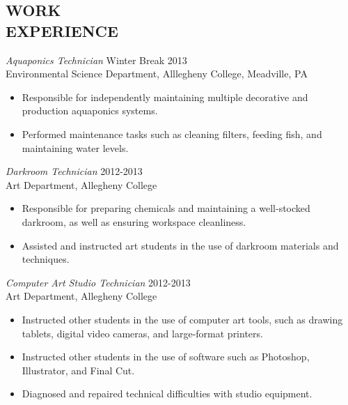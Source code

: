 \documentclass[line,margin]{res}
\begin{document}
\begin{resume}
\section{WORK \\ EXPERIENCE} 
                {\sl Aquaponics Technician} \hfill Winter Break 2013 \\
                Environmental Science Department, Alllegheny College, Meadville, PA
                 \begin{itemize}  \itemsep -2pt %
                    \item Responsible for independently maintaining multiple decorative and production aquaponics systems.
                    \item Performed maintenance tasks such as cleaning filters, feeding fish, and maintaining water levels.
                \end{itemize}
 
                {\sl Darkroom Technician} \hfill            2012-2013 \\
                Art Department, Allegheny College
                 \begin{itemize}  \itemsep -2pt %
                    \item Responsible for preparing chemicals and maintaining a well-stocked darkroom, as well as ensuring workspace cleanliness.
                    \item Assisted and instructed art students in the use of darkroom materials and techniques.
                 \end{itemize} 

                {\sl Computer Art Studio Technician} \hfill        2012-2013 \\
                Art Department, Allegheny College
                  \begin{itemize} \itemsep -2pt %
                   \item Instructed other students in the use of computer art tools, such as drawing tablets, digital video cameras, and large-format printers.
                   \item Instructed other students in the use of software such as Photoshop, Illustrator, and Final Cut.
                   \item Diagnosed and repaired technical difficulties with studio equipment.
                   \end{itemize} 
 

\end{resume}
\end{document}
